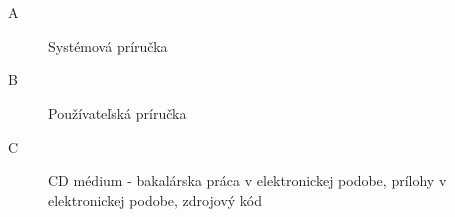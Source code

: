 
\chapter*{\appendixlistname}

\begin{description}
	\item[\appendixname{} A] Systémová príručka
    \item[\appendixname{} B] Používateľská príručka
    \item[\appendixname{} C] CD médium - bakalárska práca v elektronickej podobe, prílohy v elektronickej podobe, zdrojový kód
\end{description}
